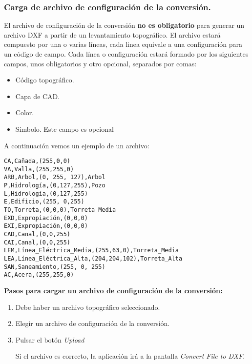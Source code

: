 \subsubsection{Carga de archivo de configuración de la conversión.}

El archivo de configuración de la conversión \textbf{no es obligatorio} para generar un archivo DXF a partir de un levantamiento topográfico. El archivo estará compuesto por una o varias líneas, cada linea equivale a una configuración para un código de campo. Cada línea o configuración estará formado por los siguientes campos, unos obligatorios y otro opcional, separados por comas:

\begin{itemize}
\item Código topográfico.
\item Capa de CAD.
\item Color.
\item Símbolo. Este campo es opcional
\end{itemize}

A continuación vemos un ejemplo de un archivo:

\begin{verbatim}
CA,Cañada,(255,0,0)
VA,Valla,(255,255,0)
ARB,Arbol,(0, 255, 127),Arbol
P,Hidrología,(0,127,255),Pozo
L,Hidrología,(0,127,255)
E,Edificio,(255, 0,255)
TO,Torreta,(0,0,0),Torreta_Media
EXD,Expropiación,(0,0,0)
EXI,Expropiación,(0,0,0)
CAD,Canal,(0,0,255)
CAI,Canal,(0,0,255)
LEM,Línea_Eléctrica_Media,(255,63,0),Torreta_Media
LEA,Línea_Eléctrica_Alta,(204,204,102),Torreta_Alta
SAN,Saneamiento,(255, 0, 255)
AC,Acera,(255,255,0)

\end{verbatim}



\textbf{\underline{Pasos para cargar un archivo de configuración de la conversión:} }

\begin{enumerate}

\item Debe haber un archivo topográfico seleccionado.
\item Elegir un archivo de configuración de la conversión.
\item Pulsar el botón \emph{Upload}

Si el archivo es correcto, la aplicación irá a la pantalla \emph{Convert File to DXF}.

\end{enumerate}

